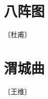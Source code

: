 \documentclass[12pt,UTF-8,openany]{ctexbook}
\begin{document}
\vspace{8pt}


\section{八阵图}

\begin{center}
    \vspace{10pt}
    
    \begin{normalsize}
        
        〔杜甫〕
        
    \end{normalsize}
    
    \vspace{8pt}
    
    \begin{large}
        
        
        
    \end{large}
    
\end{center}

\vspace{8pt}


\section{渭城曲}

\begin{center}
    \vspace{10pt}
    
    \begin{normalsize}
        
        〔王维〕
        
    \end{normalsize}
    
    \vspace{8pt}
    
    \begin{large}
        
        
        
    \end{large}
    
\end{center}
\end{document}
